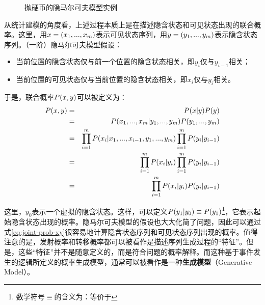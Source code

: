 \begin{figure}[htp]
\centering

\caption{抛硬币的隐马尔可夫模型实例}
\label{fig:3.3-3}
\end{figure}

\parinterval 从统计建模的角度看，上述过程本质上是在描述隐含状态和可见状态出现的联合概率。这里，用${x}=(x_1,...,x_m)$表示可见状态序列，用${y}=(y_1,...,y_m)$表示隐含状态序列。（一阶）隐马尔可夫模型假设：

\begin{itemize}
\vspace{0.5em}
\item 当前位置的隐含状态仅与前一个位置的隐含状态相关，即$y_i$仅与$y_{i-1}$相关；
\vspace{0.5em}
\item 当前位置的可见状态仅与当前位置的隐含状态相关，即$x_i$仅与$y_i$相关。
\vspace{0.5em}
\end{itemize}

于是，联合概率${P}({x},{y})$可以被定义为：
\begin{eqnarray}
{P}({x},{y}) & = & {P}({x}|{y}){P}({y}) \nonumber \\
                                                   & = & {P}(x_1,...,x_m|y_1,...,y_m) {P}(y_1,...,y_m) \nonumber \\
                                                   & = & \prod_{i=1}^{m} {P}(x_i|x_1,...,x_{i-1},y_1,...,y_m) \prod_{i=1}^{m} {P}(y_i | y_{i-1}) \nonumber \\
                                                   & = & \prod_{i=1}^{m} {P}(x_i|y_i) \prod_{i=1}^{m} {P}(y_i | y_{i-1}) \nonumber \\
                                                   & = & \prod_{i=1}^{m} {P}(x_i|y_i) {P}(y_i | y_{i-1})  \label{eq:joint-prob-xy}
\end{eqnarray}

\noindent 这里，$y_{0}$表示一个虚拟的隐含状态。这样，可以定义${P}(y_1|y_{0}) \equiv {P}(y_1)$\footnote{数学符号$\equiv$的含义为：等价于}，它表示起始隐含状态出现的概率。隐马尔可夫模型的假设也大大化简了问题，因此可以通过式\eqref{eq:joint-prob-xy}很容易地计算隐含状态序列和可见状态序列出现的概率。值得注意的是，发射概率和转移概率都可以被看作是描述序列生成过程的“特征”。但是，这些“特征”并不是随意定义的，而是符合问题的概率解释。而这种基于事件发生的逻辑所定义的概率生成模型，通常可以被看作是一种{\small\sffamily\bfseries{生成模型}}（Generative Model）。

